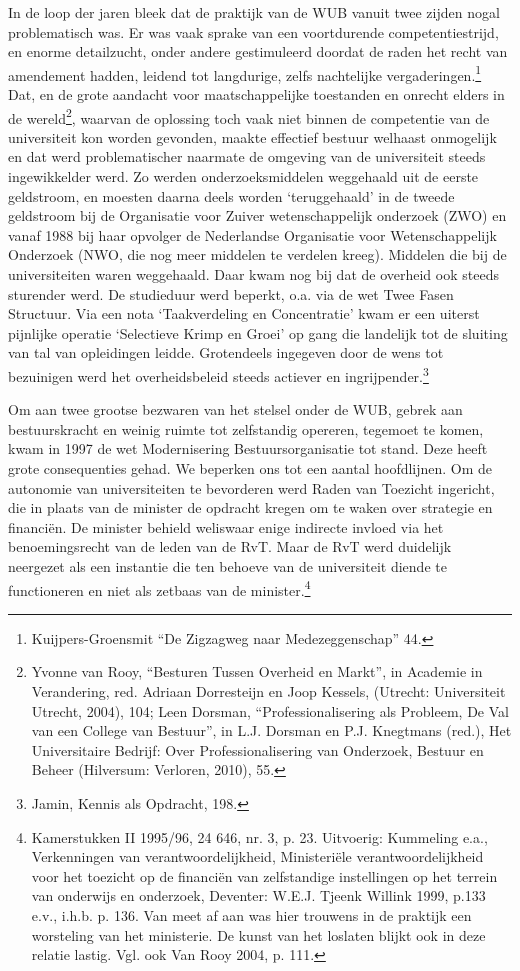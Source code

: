 \documentclass[empirical, authordate, ]{new-jote-article}
\begin{document}
	In de loop der jaren bleek dat de praktijk van de WUB vanuit twee zijden nogal problematisch was. Er was vaak sprake van een voortdurende competentiestrijd, en enorme detailzucht, onder andere gestimuleerd doordat de raden het recht van amendement hadden, leidend tot langdurige, zelfs nachtelijke vergaderingen.\footnote{Kuijpers-Groensmit “De Zigzagweg naar Medezeggenschap” 44.} Dat, en de grote aandacht voor maatschappelijke toestanden en onrecht elders in de wereld\footnote{Yvonne van Rooy, “Besturen Tussen Overheid en Markt”, in Academie in Verandering, red. Adriaan Dorresteijn en Joop Kessels, (Utrecht: Universiteit Utrecht, 2004), 104; Leen Dorsman, “Professionalisering als Probleem, De Val van een College van Bestuur”, in L.J. Dorsman en P.J. Knegtmans (red.), Het Universitaire Bedrijf: Over Professionalisering van Onderzoek, Bestuur en Beheer (Hilversum: Verloren, 2010), 55. }, waarvan de oplossing toch vaak niet binnen de competentie van de universiteit kon worden gevonden, maakte effectief bestuur welhaast onmogelijk en dat werd problematischer naarmate de omgeving van de universiteit steeds ingewikkelder werd. Zo werden onderzoeksmiddelen weggehaald uit de eerste geldstroom, en moesten daarna deels worden ‘teruggehaald' in de tweede geldstroom bij de Organisatie voor Zuiver wetenschappelijk onderzoek (ZWO) en vanaf 1988 bij haar opvolger de Nederlandse Organisatie voor Wetenschappelijk Onderzoek (NWO, die nog meer middelen te verdelen kreeg). Middelen die bij de universiteiten waren weggehaald. Daar kwam nog bij dat de overheid ook steeds sturender werd. De studieduur werd beperkt, o.a. via de wet Twee Fasen Structuur. Via een nota ‘Taakverdeling en Concentratie' kwam er een uiterst pijnlijke operatie ‘Selectieve Krimp en Groei' op gang die landelijk tot de sluiting van tal van opleidingen leidde. Grotendeels ingegeven door de wens tot bezuinigen werd het overheidsbeleid steeds actiever en ingrijpender.\footnote{Jamin, Kennis als Opdracht, 198.}



	Om aan twee grootse bezwaren van het stelsel onder de WUB, gebrek aan bestuurskracht en weinig ruimte tot zelfstandig opereren, tegemoet te komen, kwam in 1997 de wet Modernisering Bestuursorganisatie tot stand. Deze heeft grote consequenties gehad. We beperken ons tot een aantal hoofdlijnen. Om de autonomie van universiteiten te bevorderen werd Raden van Toezicht ingericht, die in plaats van de minister de opdracht kregen om te waken over strategie en financiën. De minister behield weliswaar enige indirecte invloed via het benoemingsrecht van de leden van de RvT. Maar de RvT werd duidelijk neergezet als een instantie die ten behoeve van de universiteit diende te functioneren en niet als zetbaas van de minister.\footnote{Kamerstukken II 1995/96, 24 646, nr. 3, p. 23. Uitvoerig: Kummeling e.a., Verkenningen van verantwoordelijkheid, Ministeriële verantwoordelijkheid voor het toezicht op de financiën van zelfstandige instellingen op het terrein van onderwijs en onderzoek, Deventer: W.E.J. Tjeenk Willink 1999, p.133 e.v., i.h.b. p. 136. Van meet af aan was hier trouwens in de praktijk een worsteling van het ministerie. De kunst van het loslaten blijkt ook in deze relatie lastig. Vgl. ook Van Rooy 2004, p. 111. }
\end{document}

